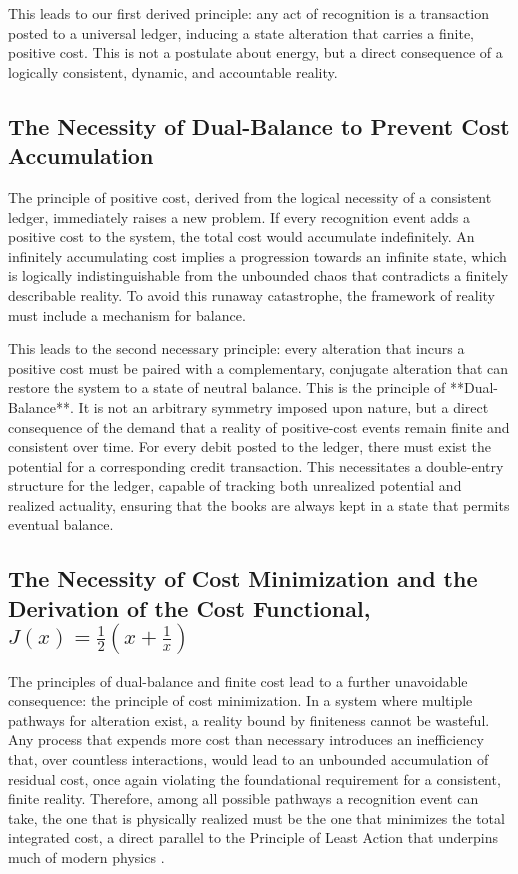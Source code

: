 This leads to our first derived principle: any act of recognition is a transaction posted to a universal ledger, inducing a state alteration that carries a finite, positive cost. This is not a postulate about energy, but a direct consequence of a logically consistent, dynamic, and accountable reality.

\subsection{The Necessity of Dual-Balance to Prevent Cost Accumulation}
The principle of positive cost, derived from the logical necessity of a consistent ledger, immediately raises a new problem. If every recognition event adds a positive cost to the system, the total cost would accumulate indefinitely. An infinitely accumulating cost implies a progression towards an infinite state, which is logically indistinguishable from the unbounded chaos that contradicts a finitely describable reality. To avoid this runaway catastrophe, the framework of reality must include a mechanism for balance.

This leads to the second necessary principle: every alteration that incurs a positive cost must be paired with a complementary, conjugate alteration that can restore the system to a state of neutral balance. This is the principle of **Dual-Balance**. It is not an arbitrary symmetry imposed upon nature, but a direct consequence of the demand that a reality of positive-cost events remain finite and consistent over time. For every debit posted to the ledger, there must exist the potential for a corresponding credit transaction. This necessitates a double-entry structure for the ledger, capable of tracking both unrealized potential and realized actuality, ensuring that the books are always kept in a state that permits eventual balance.

\subsection{The Necessity of Cost Minimization and the Derivation of the Cost Functional, \texorpdfstring{$J(x) = \frac{1}{2}(x + \frac{1}{x})$}{J(x) = 1/2(x + 1/x)}}

The principles of dual-balance and finite cost lead to a further unavoidable consequence: the principle of cost minimization. In a system where multiple pathways for alteration exist, a reality bound by finiteness cannot be wasteful. Any process that expends more cost than necessary introduces an inefficiency that, over countless interactions, would lead to an unbounded accumulation of residual cost, once again violating the foundational requirement for a consistent, finite reality. Therefore, among all possible pathways a recognition event can take, the one that is physically realized must be the one that minimizes the total integrated cost, a direct parallel to the Principle of Least Action that underpins much of modern physics \cite{Landau1976}.

